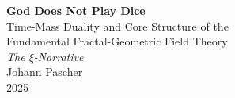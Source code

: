 \documentclass[11pt,oneside]{book}
\begin{document}
\pagestyle{fancy}
\makeatletter
\let\ps@plain\ps@fancy
\let\ps@empty\ps@fancy
\makeatother

\begin{titlepage}
	\centering
	\vspace*{2cm}
	
	{\Huge\bfseries God Does Not Play Dice}\\[0.8cm]
	{\LARGE Time-Mass Duality and Core Structure of the}\\[0.3cm]
	{\LARGE Fundamental Fractal-Geometric Field Theory}\\[1.5cm]
	
	{\Large\itshape The $\xi$-Narrative}\\[2cm]
	
	{\large Johann Pascher}\\[1cm]
	
	{\large 2025}
	
	\vfill
\end{titlepage}

\frontmatter
\pagestyle{fancy}
\tableofcontents

\mainmatter
\pagestyle{fancy}




\end{document}
